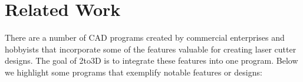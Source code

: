 
\section{Related Work}


There are a number of CAD programs created by commercial enterprises and hobbyists that incorporate some of the features valuable for creating laser cutter designs. The goal of 2to3D is to integrate these features into one program. Below we highlight some programs that exemplify notable features or designs:

